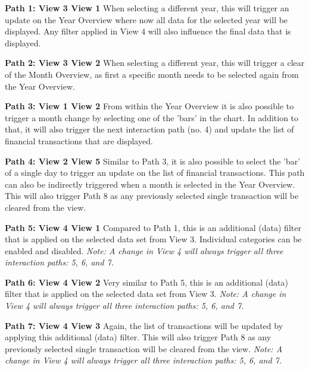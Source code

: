 \textbf{Path 1: View 3 \textrightarrow View 1} \newline
When selecting a different year, this will trigger an update on the Year Overview where now all data for the selected year will be displayed. Any filter applied in View 4 will also influence the final data that is displayed.

\textbf{Path 2: View 3 \textrightarrow View 2} \newline
When selecting a different year, this will trigger a clear of the Month Overview, as first a specific month needs to be selected again from the Year Overview.

\textbf{Path 3: View 1 \textrightarrow View 2} \newline
From within the Year Overview it is also possible to trigger a month change by selecting one of the 'bars' in the chart. In addition to that, it will also trigger the next interaction path (no. 4) and update the list of financial transactions that are displayed.

\textbf{Path 4: View 2 \textrightarrow View 5} \newline
Similar to Path 3, it is also possible to select the 'bar' of a single day to trigger an update on the list of financial transactions. This path can also be indirectly triggered when a month is selected in the Year Overview. This will also trigger Path 8 as any previously selected single transaction will be cleared from the view.

\textbf{Path 5: View 4 \textrightarrow View 1} \newline
Compared to Path 1, this is an additional (data) filter that is applied on the selected data set from View 3. Individual categories can be enabled and disabled. \textit{Note: A change in View 4 will always trigger all three interaction paths: 5, 6, and 7.}

\textbf{Path 6: View 4 \textrightarrow View 2} \newline
Very similar to Path 5, this is an additional (data) filter that is applied on the selected data set from View 3. \textit{Note: A change in View 4 will always trigger all three interaction paths: 5, 6, and 7.}

\textbf{Path 7: View 4 \textrightarrow View 3} \newline
Again, the list of transactions will be updated by applying this additional (data) filter. This will also trigger Path 8 as any previously selected single transaction will be cleared from the view. \textit{Note: A change in View 4 will always trigger all three interaction paths: 5, 6, and 7.}

